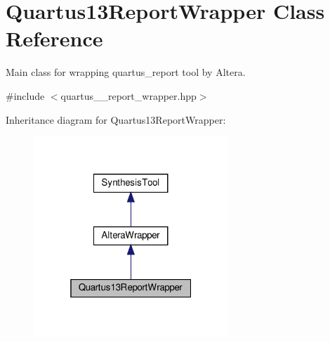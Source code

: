 \hypertarget{classQuartus13ReportWrapper}{}\section{Quartus13\+Report\+Wrapper Class Reference}
\label{classQuartus13ReportWrapper}


Main class for wrapping quartus\+\_\+report tool by Altera.  




{\ttfamily \#include $<$quartus\+\_\+\_\+report\+\_\+wrapper.\+hpp$>$}



Inheritance diagram for Quartus13\+Report\+Wrapper\+:
\nopagebreak
\begin{figure}[H]
\begin{center}
\leavevmode
\includegraphics[width=208pt]{da/db3/classQuartus13ReportWrapper__inherit__graph}
\end{center}
\end{figure}


